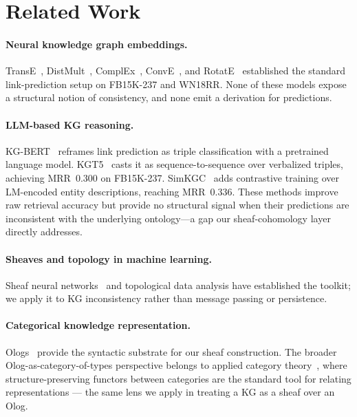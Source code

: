 \section{Related Work}
\label{sec:related}

\paragraph{Neural knowledge graph embeddings.}
TransE~\cite{transe2013}, DistMult~\cite{distmult2015}, ComplEx~\cite{complex2016},
ConvE~\cite{conve2018}, and RotatE~\cite{rotate2019} established the standard
link-prediction setup on FB15K-237 and WN18RR.
None of these models expose a structural notion of consistency, and none
emit a derivation for predictions.

\paragraph{LLM-based KG reasoning.}
KG-BERT~\cite{yao2019kgbert} reframes link prediction as triple
classification with a pretrained language model. KGT5~\cite{saxena2022sequence}
casts it as sequence-to-sequence over verbalized triples, achieving
MRR~$0.300$ on FB15K-237. SimKGC~\cite{wang2022simkgc} adds contrastive
training over LM-encoded entity descriptions, reaching MRR~$0.336$. These
methods improve raw retrieval accuracy but provide no structural signal
when their predictions are inconsistent with the underlying ontology---a
gap our sheaf-cohomology layer directly addresses.

\paragraph{Sheaves and topology in machine learning.}
Sheaf neural networks~\cite{bodnar2022sheaf, hansen2020sheaf} and topological
data analysis have established the toolkit; we apply it to KG
inconsistency rather than message passing or persistence.

\paragraph{Categorical knowledge representation.}
Ologs~\cite{spivak2012olog} provide the syntactic substrate for our sheaf
construction. The broader Olog-as-category-of-types perspective belongs to
applied category theory~\cite{fongspivak2019}, where structure-preserving
functors between categories are the standard tool for relating
representations --- the same lens we apply in treating a KG as a sheaf
over an Olog.

